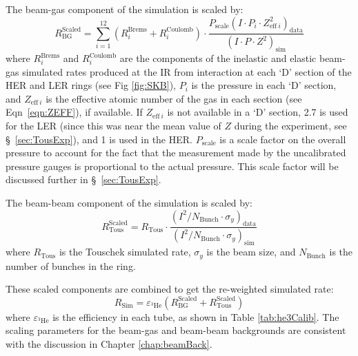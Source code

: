 The beam-gas component of the simulation is scaled by:
\begin{equation}
	{R_{\mathrm{BG}}^{\mathrm{Scaled}} = \sum _{i=1}^{12}(R^{\mathrm{Brems}}_i+R^{\mathrm{Coulomb}}_i)\cdot\frac{P_{\mathrm{scale}}(I\cdot P_i\cdot Z_{\mathrm{eff}~i}^{2})_{\mathrm{data}}} {(I\cdot P\cdot Z^{2})_{\mathrm{sim}}}}
\end{equation}
where $R^{\mathrm{Brems}}_{i}$ and $R^{\mathrm{Coulomb}}_{i}$ are the components of the inelastic and elastic beam-gas simulated rates produced at the IR from interaction at each `D' section of the HER and LER rings (see Fig \ref{fig:SKB}), $P_{i}$ is the pressure in each `D' section, and $Z_{\mathrm{eff}~i}$ is the effective atomic number of the gas in each section (see Eqn~\ref{eqn:ZEFF}), if available. If $Z_{\mathrm{eff}~i}$ is not available in a `D' section, 2.7 is used for the LER (since this was near the mean value of $Z$ during the experiment, see \S~\ref{sec:TousExp}), and 1 is used in the HER.  $P_{\mathrm{scale}}$ is a scale factor on the overall pressure to account for the fact that the measurement made by the uncalibrated pressure gauges is proportional to the actual pressure. This scale factor will be discussed further in \S~\ref{sec:TousExp}.

The beam-beam component of the simulation is scaled by:
\begin{equation}
	{R_{\mathrm{Tous}}^{\mathrm{Scaled}} = R_{\mathrm{Tous}}\cdot\frac{(I^{2}/N_{\mathrm{Bunch}}\cdot\sigma_{y})_{\mathrm{data}} }{(I^{2}/N_{\mathrm{Bunch}}\cdot\sigma_{y})_{\mathrm{sim}}}}
\end{equation}
where $R_{\mathrm{Tous}}$ is the Touschek simulated rate, $\sigma_{y}$ is the beam size, and $N_{\mathrm{Bunch}}$ is the number of bunches in the ring.

These scaled components are combined to get the re-weighted simulated rate:
\begin{equation}
	{R_{\mathrm{Sim}} = \varepsilon_{^3\mathrm{He}}\left(R_{\mathrm{BG}}^{\mathrm{Scaled}}+R_{\mathrm{Tous}}^{\mathrm{Scaled}}\right)}
\end{equation}
where $\varepsilon_{^3\mathrm{He}}$ is the efficiency in each \he tube, as shown in Table \ref{tab:he3Calib}. The scaling parameters for the beam-gas and beam-beam backgrounds are consistent with the discussion in Chapter \ref{chap:beamBack}.



